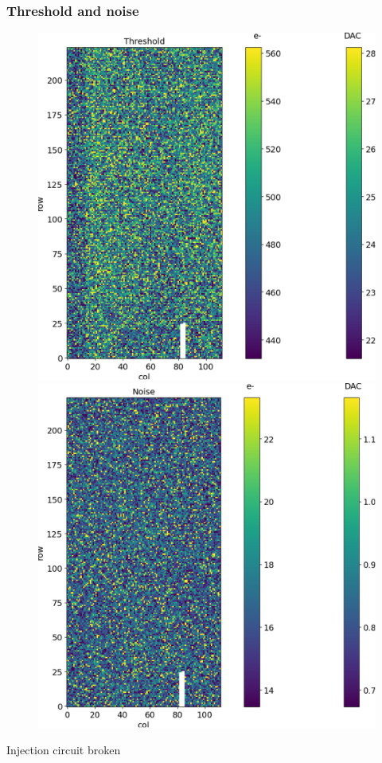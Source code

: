     \begin{frame}
        \frametitle{Threshold and noise}
        \begin{figure}[h!]
            \centering
            \includegraphics[width=.45\linewidth]{figures/charaterization/threshold_map.pdf}
            \includegraphics[width=.45\linewidth]{figures/charaterization/noise_map.pdf}
        \end{figure}
        Injection circuit broken
    \end{frame}

